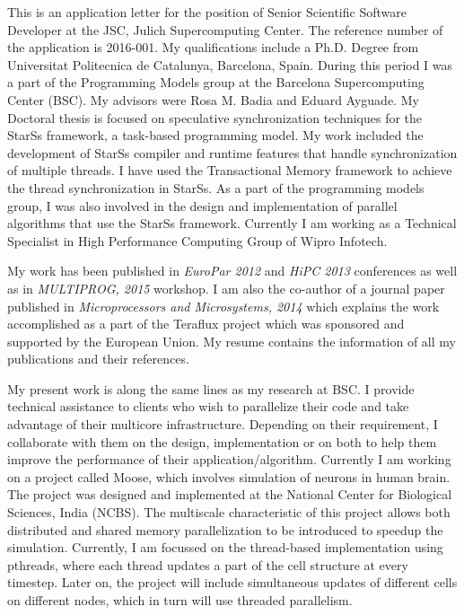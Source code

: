 \documentclass[10pt,stdletter,dateno]{newlfm}
\begin{document}
\begin{newlfm}
	   This is an application letter for the position of Senior Scientific Software Developer at the JSC, Julich Supercomputing Center. The reference number of the application is 2016-001.
	   My qualifications include a Ph.D. Degree from Universitat Politecnica de Catalunya, Barcelona, Spain. 
	   During this period I was a part of the Programming Models group at the Barcelona Supercomputing Center (BSC). 
	   My advisors were Rosa M. Badia and Eduard Ayguade. 
	   My Doctoral thesis is focused on speculative synchronization techniques for the StarSs framework, a task-based programming model.
	   My work included the development of StarSs compiler and runtime features that handle synchronization of multiple threads.
	   I have used the Transactional Memory framework to achieve the thread synchronization in StarSs.
	   As a part of the programming models group, I was also involved in the design and implementation of parallel algorithms that use the StarSs framework.
	   Currently I am working as a Technical Specialist in High Performance Computing Group of Wipro Infotech. 
%
\par
	   My work has been published in \textit{EuroPar 2012} and \textit{HiPC 2013} conferences as well as in \textit{MULTIPROG, 2015} workshop.  
	   I am also the co-author of a journal paper published in \textit{Microprocessors and Microsystems, 2014} which explains the work accomplished as a part of the Teraflux project which was sponsored and supported by the European Union. 
	   My resume contains the information of all my publications and their references. 
%
\par
	   My present work is along the same lines as my research at BSC. 
	   I provide technical assistance to clients who wish to parallelize their code and take advantage of their multicore infrastructure. 
	   Depending on their requirement, I collaborate with them on the design, implementation or on both to help them improve the performance of their application/algorithm.
	   Currently I am working on a project called Moose, which involves simulation of neurons in human brain. 
	   The project was designed and implemented at the National Center for Biological Sciences, India (NCBS). 
	   The multiscale characteristic of this project allows both distributed and shared memory parallelization to be introduced to speedup the simulation. 
	   Currently, I am focussed on the thread-based implementation using pthreads, where each thread updates a part of the cell structure at every timestep. 
	   Later on, the project will include simultaneous updates of different cells on different nodes, which in turn will use threaded parallelism. 

\end{newlfm}
\end{document}
